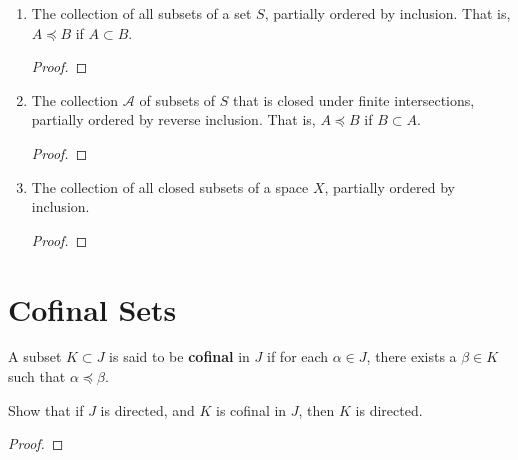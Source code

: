 \documentclass[12pt]{article}
\begin{document}
\begin{enumerate}
\begin{proof}
\begin{enumerate}
			            let $a, b \in A$. We wish to show that there exists a $c \in A$ with $a \leq c$ and $b \leq c$.

			            $A$ is simply ordered, so either $a < b$ or $b < a$. Without loss of generality, let $a < b$. But from (\ref{pf:part-order}) $A$ is partially ordered by $\leq$, so we have $b \leq b$!
		      \end{enumerate}
		      Then $\leq$ is a partial ordering on $A$ and for every pair $a, b \in A$ we have either $a \leq b$ and $b \leq b$, or we have $b \leq a$ and $a \leq a$! Thus $A$ is directed.
	      \end{proof}

	\item The collection of all subsets of a set $S$, partially ordered by inclusion. That is, $A \preceq B$ if $A \subset B$.
	      \begin{proof}
	      \end{proof}

	\item The collection $\mathcal A$ of subsets of $S$ that is closed under finite intersections, partially ordered by reverse inclusion. That is, $A \preceq B$ if $B \subset A$.
	      \begin{proof}
	      \end{proof}

	\item The collection of all closed subsets of a space $X$, partially ordered by inclusion.
	      \begin{proof}
	      \end{proof}
\end{enumerate}

\section{Cofinal Sets}
\begin{defn}
	A subset $K \subset J$ is said to be \textbf{cofinal} in $J$ if for each $\alpha \in J$, there exists a $\beta \in K$ such that $\alpha \preceq \beta$.
\end{defn}

Show that if $J$ is directed, and $K$ is cofinal in $J$, then $K$ is directed.

\begin{proof}
\end{proof}
\end{document}
